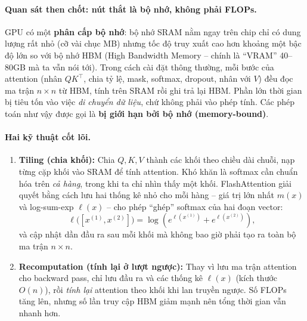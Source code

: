 \paragraph{Quan sát then chốt: nút thắt là bộ nhớ, không phải FLOPs.}
GPU có một \textbf{phân cấp bộ nhớ}: bộ nhớ SRAM nằm ngay trên chip chỉ có dung lượng rất nhỏ (cỡ vài chục MB) nhưng tốc độ truy xuất cao hơn khoảng một bậc độ lớn so với bộ nhớ HBM (High Bandwidth Memory -- chính là “VRAM” 40--80GB mà ta vẫn nói tới). Trong cách cài đặt thông thường, mỗi bước của attention (nhân $QK^\top$, chia tỷ lệ, mask, softmax, dropout, nhân với $V$) đều đọc ma trận $n\times n$ từ HBM, tính trên SRAM rồi ghi trả lại HBM. Phần lớn thời gian bị tiêu tốn vào việc \emph{di chuyển dữ liệu}, chứ không phải vào phép tính. Các phép toán như vậy được gọi là \textbf{bị giới hạn bởi bộ nhớ (memory-bound)}.

\begin{center}
\label{fig:flashattention}
\end{center}

\paragraph{Hai kỹ thuật cốt lõi.}
\begin{enumerate}
	\item \textbf{Tiling (chia khối):} Chia $Q, K, V$ thành các khối theo chiều dài chuỗi, nạp từng cặp khối vào SRAM để tính attention. Khó khăn là softmax cần chuẩn hóa trên \emph{cả hàng}, trong khi ta chỉ nhìn thấy một khối. FlashAttention giải quyết bằng cách lưu hai thống kê nhỏ cho mỗi hàng -- giá trị lớn nhất $m(x)$ và log-sum-exp $\ell(x)$ -- cho phép “ghép” softmax của hai đoạn vector:
	\[
	\ell\big([x^{(1)}, x^{(2)}]\big) = \log\left(e^{\ell(x^{(1)})} + e^{\ell(x^{(2)})}\right),
	\]
	và cập nhật dần đầu ra sau mỗi khối mà không bao giờ phải tạo ra toàn bộ ma trận $n\times n$.
	\item \textbf{Recomputation (tính lại ở lượt ngược):} Thay vì lưu ma trận attention cho backward pass, chỉ lưu đầu ra và các thống kê $\ell(x)$ (kích thước $O(n)$), rồi \emph{tính lại} attention theo khối khi lan truyền ngược. Số FLOPs tăng lên, nhưng số lần truy cập HBM giảm mạnh nên tổng thời gian vẫn nhanh hơn.
\end{enumerate}

